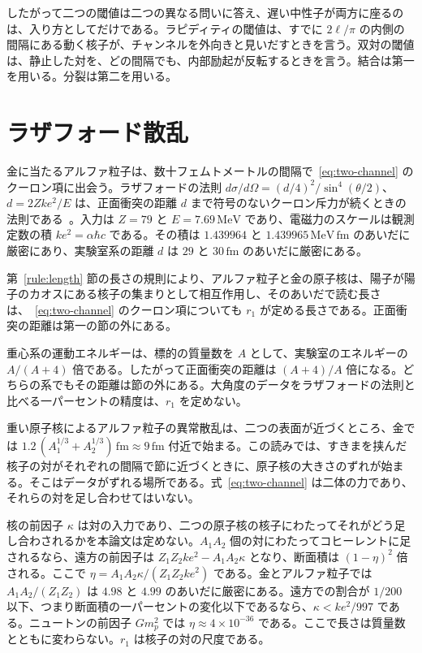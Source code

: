 \documentclass[a4paper]{article}
\begin{document}
したがって二つの閾値は二つの異なる問いに答え、遅い中性子が両方に座るのは、入り方としてだけである。ラピディティの閾値は、すでに \(2\ell/\pi\) の内側の間隔にある動く核子が、チャンネルを外向きと見いだすときを言う。双対の閾値は、静止した対を、どの間隔でも、内部励起が反転するときを言う。結合は第一を用いる。分裂は第二を用いる。

\section{ラザフォード散乱}
\label{sec:rutherford}

金に当たるアルファ粒子は、数十フェムトメートルの間隔で~\eqref{eq:two-channel} のクーロン項に出会う。ラザフォードの法則 \(d\sigma/d\Omega=(d/4)^{2}/\sin^{4}(\theta/2)\)、\(d=2Zke^{2}/E\) は、正面衝突の距離 \(d\) まで符号のないクーロン斥力が続くときの法則である~\cite{rutherford1911,geiger1913}。入力は \(Z=79\) と \(E=7.69\,\mathrm{MeV}\) であり、電磁力のスケールは観測定数の積 \(ke^{2}=\alpha\hbar c\) である。その積は \(1.439964\) と \(1.439965\,\mathrm{MeV\,fm}\) のあいだに厳密にあり、実験室系の距離 \(d\) は \(29\) と \(30\,\mathrm{fm}\) のあいだに厳密にある。

第~\ref{rule:length} 節の長さの規則により、アルファ粒子と金の原子核は、陽子が陽子のカオスにある核子の集まりとして相互作用し、そのあいだで読む長さは、~\eqref{eq:two-channel} のクーロン項についても \(r_1\) が定める長さである。正面衝突の距離は第一の節の外にある。

重心系の運動エネルギーは、標的の質量数を \(A\) として、実験室のエネルギーの \(A/(A+4)\) 倍である。したがって正面衝突の距離は \((A+4)/A\) 倍になる。どちらの系でもその距離は節の外にある。大角度のデータをラザフォードの法則と比べる一パーセントの精度は、\(r_1\) を定めない。

重い原子核によるアルファ粒子の異常散乱は、二つの表面が近づくところ、金では \(1.2\,(A_1^{1/3}+A_2^{1/3})\,\mathrm{fm}\approx 9\,\mathrm{fm}\) 付近で始まる。この読みでは、すきまを挟んだ核子の対がそれぞれの間隔で節に近づくときに、原子核の大きさのずれが始まる。そこはデータがずれる場所である。式~\eqref{eq:two-channel} は二体の力であり、それらの対を足し合わせてはいない。

核の前因子 \(\kappa\) は対の入力であり、二つの原子核の核子にわたってそれがどう足し合わされるかを本論文は定めない。\(A_1A_2\) 個の対にわたってコヒーレントに足されるなら、遠方の前因子は \(Z_1Z_2ke^{2}-A_1A_2\kappa\) となり、断面積は \((1-\eta)^{2}\) 倍される。ここで \(\eta=A_1A_2\kappa/(Z_1Z_2ke^{2})\) である。金とアルファ粒子では \(A_1A_2/(Z_1Z_2)\) は \(4.98\) と \(4.99\) のあいだに厳密にある。遠方での割合が \(1/200\) 以下、つまり断面積の一パーセントの変化以下であるなら、\(\kappa<ke^{2}/997\) である。ニュートンの前因子 \(Gm_p^{2}\) では \(\eta\approx 4\times 10^{-36}\) である。ここで長さは質量数とともに変わらない。\(r_1\) は核子の対の尺度である。
\end{document}
